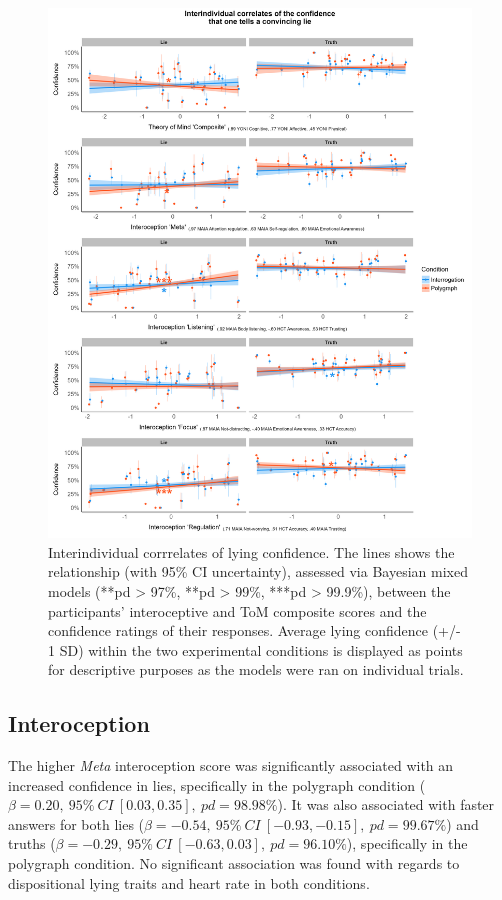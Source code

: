 \documentclass[
  man,mask,floatsintext]{apa6}
\begin{document}
\begin{figure}
\includegraphics[width=1\linewidth]{../figures/figure1} \caption{Interindividual corrrelates of lying confidence. The lines shows the relationship (with 95\% CI uncertainty), assessed via Bayesian mixed models (\***pd > 97\%, \***pd > 99\%, \****pd > 99.9\%), between the participants' interoceptive and ToM composite scores and the confidence ratings of their responses. Average lying confidence (+/- 1 SD) within the two experimental conditions is displayed as points for descriptive purposes as the models were ran on individual trials.}\label{fig:unnamed-chunk-1}
\end{figure}

\hypertarget{interoception-1}{%
\subsection{Interoception}\label{interoception-1}}

The higher \emph{Meta} interoception score was significantly associated with an increased confidence in lies, specifically in the polygraph condition (\(\beta=0.20,~95\%~CI~[0.03, 0.35],~pd = 98.98\%\)). It was also associated with faster answers for both lies (\(\beta=-0.54,~95\%~CI~[-0.93, -0.15],~pd = 99.67\%\)) and truths (\(\beta=-0.29,~95\%~CI~[-0.63, 0.03],~pd = 96.10\%\)), specifically in the polygraph condition. No significant association was found with regards to dispositional lying traits and heart rate in both conditions.
\end{document}

